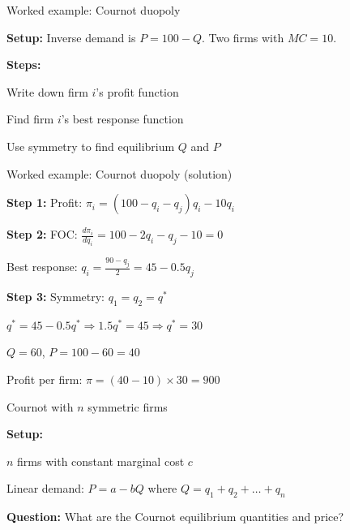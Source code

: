 \documentclass[notes,11pt, aspectratio=169]{beamer}
\newenvironment{wideitemize}{\itemize\addtolength{\itemsep}{10pt}}{\enditemize}
\newenvironment{wideenumerate}{\enumerate\addtolength{\itemsep}{10pt}}{\endenumerate}
\begin{document}
\begin{frame}{Worked example: Cournot duopoly}
	\begin{wideitemize}
		\item \textbf{Setup:} Inverse demand is $P = 100 - Q$. Two firms with $MC = 10$.
		\item \textbf{Steps:}
		\begin{wideenumerate}
			\item Write down firm $i$'s profit function
			\item Find firm $i$'s best response function
			\item Use symmetry to find equilibrium $Q$ and $P$
		\end{wideenumerate}
	\end{wideitemize}
\end{frame}

\begin{frame}{Worked example: Cournot duopoly (solution)}
	\begin{wideitemize}
		\item \textbf{Step 1:} Profit: $\pi_i = (100 - q_i - q_j)q_i - 10q_i$
		\item \textbf{Step 2:} FOC: $\frac{d\pi_i}{dq_i} = 100 - 2q_i - q_j - 10 = 0$
		\item Best response: $q_i = \frac{90 - q_j}{2} = 45 - 0.5q_j$
		\item \textbf{Step 3:} Symmetry: $q_1 = q_2 = q^*$
		\item $q^* = 45 - 0.5q^* \Rightarrow 1.5q^* = 45 \Rightarrow q^* = 30$
		\item $Q = 60$, $P = 100 - 60 = 40$
		\item Profit per firm: $\pi = (40 - 10) \times 30 = 900$
	\end{wideitemize}
\end{frame}

\begin{frame}{Cournot with $n$ symmetric firms}
	\begin{wideitemize}
		\item \textbf{Setup:}
		\item $n$ firms with constant marginal cost $c$
		\item Linear demand: $P = a - bQ$ where $Q = q_1 + q_2 + \ldots + q_n$
		\item \textbf{Question:} What are the Cournot equilibrium quantities and price?
	\end{wideitemize}
\end{frame}
\end{document}
